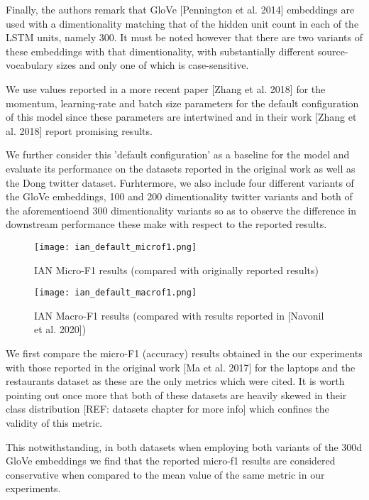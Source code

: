 \documentclass[../../fyp.tex]{subfiles}
\begin{document}
Finally, the authors remark that GloVe [Pennington et al. 2014] embeddings are used with a dimentionality matching that of the hidden unit count in each of the LSTM units, namely 300. It must be noted however that there are two variants of these embeddings with that dimentionality, with substantially different source-vocabulary sizes and only one of which is case-sensitive.

We use values reported in a more recent paper [Zhang et al. 2018] for the momentum, learning-rate and batch size parameters for the default configuration of this model since these parameters are intertwined and in their work [Zhang et al. 2018] report promising results. 

We further consider this 'default configuration' as a baseline for the model and evaluate its performance on the datasets reported in the original work as well as the Dong twitter dataset. Furhtermore, we also include four different variants of the GloVe embeddings, 100 and 200 dimentionality twitter variants and both of the aforementioend 300 dimentionality variants so as to observe the difference in downstream performance these make with respect to the reported results. 

\begin{figure}[!ht]
	\centering
	\texttt{[image: ian\_default\_microf1.png]}
	\caption{IAN Micro-F1 results (compared with originally reported results)}
	\label{fig:ffnn}
\end{figure}

\begin{figure}[!ht]
	\centering
	\texttt{[image: ian\_default\_macrof1.png]}
	\caption{IAN Macro-F1 results (compared with results reported in [Navonil et al. 2020])}
	\label{fig:ffnn}
\end{figure}

We first compare the micro-F1 (accuracy) results obtained in the our experiments with those reported in the original work [Ma et al. 2017] for the laptops and the restaurants dataset as these are the only metrics which were cited. It is worth pointing out once more that both of these datasets are heavily skewed in their class distribution [REF: datasets chapter for more info] which confines the validity of this metric.

This notwithstanding, in both datasets when employing both variants of the 300d GloVe embeddings we find that the reported micro-f1 results are considered conservative when compared to the mean value of the same metric in our experiments. 
\end{document}
